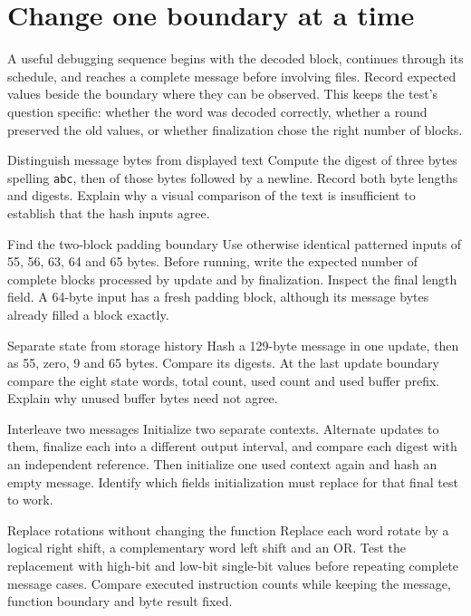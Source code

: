 \section{Change one boundary at a time}
A useful debugging sequence begins with the decoded block, continues through its
schedule, and reaches a complete message before involving files. Record expected
values beside the boundary where they can be observed. This keeps the test's question
specific: whether the word was decoded correctly, whether a round preserved the old
values, or whether finalization chose the right number of blocks.

\begin{MARSExercise}{Distinguish message bytes from displayed text}
Compute the digest of three bytes spelling \texttt{abc}, then of those bytes followed
by a newline. Record both byte lengths and digests. Explain why a visual comparison of
the text is insufficient to establish that the hash inputs agree.
\end{MARSExercise}

\begin{MARSExercise}{Find the two-block padding boundary}
Use otherwise identical patterned inputs of 55, 56, 63, 64 and 65 bytes. Before running,
write the expected number of complete blocks processed by update and by finalization.
Inspect the final length field. A 64-byte input has a fresh padding block, although
its message bytes already filled a block exactly.
\end{MARSExercise}

\begin{MARSExercise}{Separate state from storage history}
Hash a 129-byte message in one update, then as 55, zero, 9 and 65 bytes. Compare its
digests. At the last update boundary compare the eight state words, total count, used
count and used buffer prefix. Explain why unused buffer bytes need not agree.
\end{MARSExercise}

\begin{MARSExercise}{Interleave two messages}
Initialize two separate contexts. Alternate updates to them, finalize each into a
different output interval, and compare each digest with an independent reference.
Then initialize one used context again and hash an empty message. Identify which
fields initialization must replace for that final test to work.
\end{MARSExercise}

\begin{MARSExercise}{Replace rotations without changing the function}
Replace each word rotate by a logical right shift, a complementary word left shift
and an OR. Test the replacement with high-bit and low-bit single-bit values before
repeating complete message cases. Compare executed instruction counts while keeping
the message, function boundary and byte result fixed.
\end{MARSExercise}

